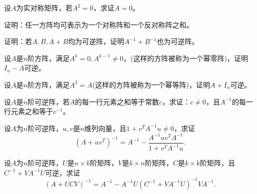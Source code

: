 \begin{ex} \label{ex:3.23}
设$A$为实对称矩阵，若$A^2 = 0$，求证$A = 0$。
\end{ex}

\begin{ex} \label{ex:3.24}
证明：任一方阵均可表示为一个对称阵和一个反对称阵之和。
\end{ex}

\begin{ex} \label{ex:3.25}
证明：若$A, B, A + B$均为可逆阵，证明$A^{-1} + B^{-1}$也为可逆阵。
\end{ex}

\begin{ex} \label{ex:3.26}
设$A$是$n$阶方阵，满足$A^k = 0, A^{k-1} \neq 0$，(这样的方阵被称为一个幂零阵)，证明$I_n - A$可逆。
\end{ex}

\begin{ex} \label{ex:3.27}
设$A$是$n$阶方阵，满足$A^2 = A$(这样的方阵被称为一个幂等阵)，证明$A + I_n$可逆。
\end{ex}


\begin{ex} \label{ex:3.29}
设$A$是$n$阶可逆阵，若$A$的每一行元素之和等于常数$c$，求证：$c\neq 0$，且$A^{-1}$的每一行元素之和等于$c^{-1}$。
\end{ex}

\begin{ex} \label{ex:3.30}
设$A$为$n$阶可逆阵，$u,v$是$n$维列向量，且$1 + v^T A^{-1}u \neq 0$，求证
$$(A+uv^T)^{-1} = A^{-1} - \frac{A^{-1}uv^T A^{-1}}{1 + v^T A^{-1}u}.$$
\end{ex}

\begin{ex} \label{ex:3.31}
设$A$为$n$阶可逆阵，$U$是$n\times k$阶矩阵，$V$是$k\times n$阶矩阵，$C$是$k\times k$阶矩阵，且$ C^{-1}+VA^{-1}U$可逆，求证
$$ \left(A+UCV \right)^{-1} = A^{-1} - A^{-1}U \left(C^{-1}+VA^{-1}U \right)^{-1} VA^{-1}.$$
\end{ex}

\newpage


